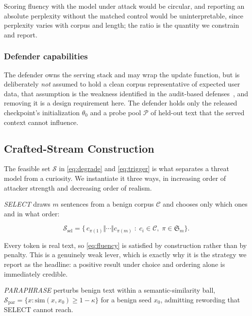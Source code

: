 \documentclass[journal]{IEEEtran}
\newcommand{\anchorp}{\theta_{0}}
\begin{document}
Scoring fluency with the model under attack would be circular, and reporting an
absolute perplexity without the matched control would be uninterpretable, since
perplexity varies with corpus and length; the ratio is the quantity we constrain and
report.

\subsubsection{Defender capabilities}
The defender owns the serving stack and may wrap the update function, but is
deliberately \emph{not} assumed to hold a clean corpus representative of expected
user data, that assumption is the weakness identified in the audit-based
defenses~\cite{basak2025dpad,nawshin2026concurrent}, and removing it is a design
requirement here. The defender holds only the released checkpoint's initialization
$\anchorp$ and a probe pool $\mathcal{P}$ of held-out text that the served context
cannot influence.

\subsection{Crafted-Stream Construction}
\label{sec:craft}

The feasible set $\mathcal{S}$ in \eqref{eq:degrade} and \eqref{eq:trigger} is what
separates a threat model from a curiosity. We instantiate it three ways, in
increasing order of attacker strength and decreasing order of realism.

\emph{SELECT} draws $m$ sentences from a benign corpus $\mathcal{C}$ and chooses only
which ones and in what order:

\begin{equation}
\mathcal{S}_{\mathrm{sel}} =
\Big\{\, c_{\pi(1)} \Vert \cdots \Vert c_{\pi(m)}
\;:\; c_i \in \mathcal{C},\; \pi \in \mathfrak{S}_m \Big\}.
\label{eq:select}
\end{equation}

Every token is real text, so \eqref{eq:fluency} is satisfied by construction rather
than by penalty. This is a genuinely weak lever, which is exactly why it is the
strategy we report as the headline: a positive result under choice and ordering
alone is immediately credible.

\emph{PARAPHRASE} perturbs benign text within a semantic-similarity ball,
$\mathcal{S}_{\mathrm{par}} = \{x : \mathrm{sim}(x, x_{0}) \geq 1-\kappa\}$ for a
benign seed $x_{0}$, admitting rewording that SELECT cannot reach.
\end{document}
